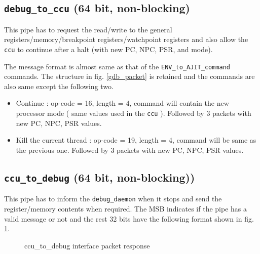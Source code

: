 \documentclass[a4paper, 11pt]{article}
\begin{document}
\subsection{\texttt{debug\_to\_ccu} (64 bit, non-blocking)}
This pipe has to request the read/write to the general registers/memory/breakpoint registers/watchpoint registers and also allow the \texttt{ccu} to continue after a halt (with new PC, NPC, PSR, and mode).

The message format is almost same as that of the \texttt{ENV\_to\_AJIT\_command} 
commands. The structure in fig. \ref{gdb_packet} is retained and the commands are also same except the following two.
\begin{itemize}
		\item Continue : op-code = 16, length = 4, command will contain the new processor mode ( same values used in the \texttt{ccu} ). Followed by 3 packets with new PC, NPC, PSR values. 
		
		\item Kill the current thread : op-code = 19, length = 4, command will be same as the previous one. Followed by 3 packets with new PC, NPC, PSR values. 
				
\end{itemize}

\subsection{\texttt{ccu\_to\_debug} (64 bit, non-blocking))}
This pipe has to inform the \texttt{debug\_daemon} when it stops and send the register/memory contents when required. The MSB indicates if the pipe has a valid message or not and the rest 32 bits have the following format shown in fig. \ref{packet2}.
\begin{figure}[h!]
	\centering
	\caption{ccu\_to\_debug interface packet response}
	\label{packet2}
\end{figure}
\end{document}
